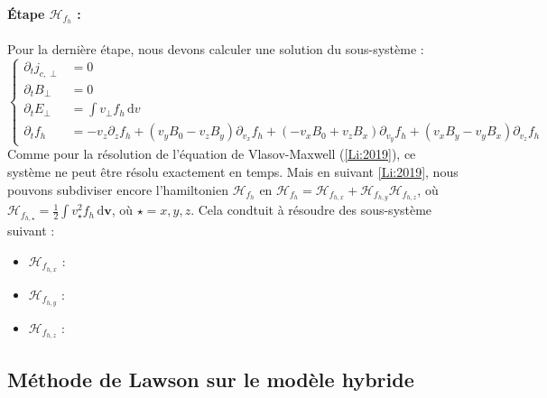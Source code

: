 \paragraph{Étape $\mathcal{H}_{f_h}$ :\\}

Pour la dernière étape, nous devons calculer une solution du sous-système :
$$
  \begin{cases}
    \partial_t  j_{c,\perp} &= 0 \\
    \partial_t B_\perp      &= 0 \\
    \partial_t E_\perp      &= \int v_\perp f_h\,\mathrm{d}v\\
    \partial_t f_h          &= -v_z\partial_zf_h + (v_yB_0-v_zB_y)\partial_{v_x}f_h + (-v_xB_0+v_zB_x)\partial_{v_y}f_h + (v_xB_y - v_yB_x)\partial_{v_z}f_h
  \end{cases}
$$
Comme pour la résolution de l'équation de Vlasov-Maxwell (\ref{Li:2019}), ce système ne peut être résolu exactement en temps. Mais en suivant \ref{Li:2019}, nous pouvons subdiviser encore l'hamiltonien $\mathcal{H}_{f_h}$ en $\mathcal{H}_{f_h}=\mathcal{H}_{f_{h,x}}+\mathcal{H}_{f_{h,y}}\mathcal{H}_{f_{h,z}}$, où $\mathcal{H}_{f_{h,\star}}=\frac{1}{2}\int v_{\star}^2 f_h\,\mathrm{d}\textbf{v}$, où $\star=x,y,z$. Cela condtuit à résoudre des sous-système suivant :
\begin{itemize}
  \item $\mathcal{H}_{f_{h,x}}$ :
  \item $\mathcal{H}_{f_{h,y}}$ :
  \item $\mathcal{H}_{f_{h,z}}$ :
\end{itemize}
 



\subsection{Méthode de Lawson sur le modèle hybride}

